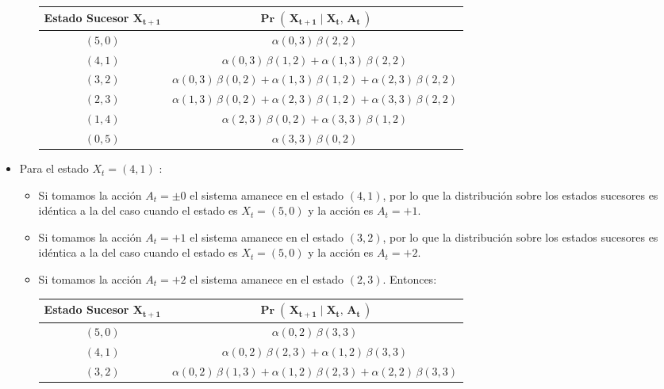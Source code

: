\documentclass[ a4paper, twoside, 11pt]{article}
\begin{document}
\begin{problem}
\begin{itemize}
\begin{itemize}
\begin{table}[H]
\centering
\begin{tabular}{|c|c|}
\hline
\textbf{Estado Sucesor} $\boldsymbol{X_{t+1}}$
& $\boldsymbol{\Pr( \, X_{t+1} \mid X_t, \, A_t \, )}$ \\ \hline
$(5,0)$ & $\alpha(0,3) \, \beta(2,2)$ \\ \hline
$(4,1)$ & $\alpha(0,3) \, \beta(1,2) + \alpha(1,3) \, \beta(2,2)$ \\ \hline
$(3,2)$ & $\alpha(0,3) \, \beta(0,2) + \alpha(1,3) \, \beta(1,2) + \alpha(2,3) \, \beta(2,2)$ \\ \hline
$(2,3)$ & $\alpha(1,3) \, \beta(0,2) + \alpha(2,3) \, \beta(1,2) + \alpha(3,3) \, \beta(2,2)$ \\ \hline
$(1,4)$ & $\alpha(2,3) \, \beta(0,2) + \alpha(3,3) \, \beta(1,2)$ \\ \hline
$(0,5)$ & $\alpha(3,3) \, \beta(0,2)$ \\ \hline
\end{tabular}
\end{table}
\end{itemize}
\item Para el estado $X_t = (4,1)$ :
\begin{itemize}
\item Si tomamos la acci\'on $A_t = \pm 0$ el sistema amanece en el estado $(4,1)$, por lo que la distribuci\'on sobre los estados sucesores es id\'entica a la del caso cuando el estado es $X_t = (5,0)$ y la acci\'on es $A_t = +1$. 
\item Si tomamos la acci\'on $A_t = +1$ el sistema amanece en el estado $(3,2)$, por lo que la distribuci\'on sobre los estados sucesores es id\'entica a la del caso cuando el estado es $X_t = (5,0)$ y la acci\'on es $A_t = +2$. 
\item Si tomamos la acci\'on $A_t = +2$ el sistema amanece en el estado $(2,3)$. Entonces: 
\begin{table}[H]
\centering
\begin{tabular}{|c|c|}
\hline
\textbf{Estado Sucesor} $\boldsymbol{X_{t+1}}$
& $\boldsymbol{\Pr( \, X_{t+1} \mid X_t, \, A_t \, )}$ \\ \hline
$(5,0)$ & $\alpha(0,2) \, \beta(3,3)$ \\ \hline
$(4,1)$ & $\alpha(0,2) \, \beta(2,3) + \alpha(1,2) \, \beta(3,3)$ \\ \hline
$(3,2)$ & $\alpha(0,2) \, \beta(1,3) + \alpha(1,2) \, \beta(2,3) + \alpha(2,2) \, \beta(3,3)$ \\ \hline

\end{tabular}
\end{table}
\end{itemize}
\end{itemize}
\end{problem}
\end{document}
